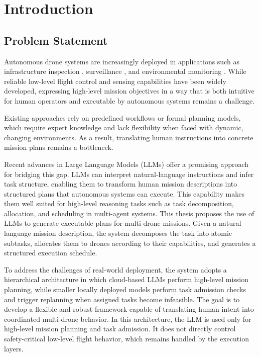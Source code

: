 \chapter{Introduction}

\section{Problem Statement}
Autonomous drone systems are increasingly deployed in applications such as infrastructure inspection \cite{jacobsen2023drone},
surveillance \cite{dinesh2018autonomous}, and environmental monitoring \cite{anderson2013uav}. While reliable low-level flight 
control and sensing capabilities have been widely developed, expressing high-level mission objectives in a
way that is both intuitive for human operators and executable by autonomous systems remains
a challenge.

Existing approaches rely on predefined workflows or formal planning models, which require expert knowledge and lack flexibility
when faced with dynamic, changing environments. As a result, translating human instructions into concrete mission plans
remains a bottleneck.

Recent advances in Large Language Models (LLMs) offer a promising approach for bridging
this gap. LLMs can interpret natural-language instructions and infer task structure, enabling
them to transform human mission descriptions into structured plans that autonomous systems
can execute. This capability makes them well suited for high-level reasoning tasks such as task
decomposition, allocation, and scheduling in multi-agent systems.
This thesis proposes the use of LLMs to generate executable plans for multi-drone missions.
Given a natural-language mission description, the system decomposes the task into atomic
subtasks, allocates them to drones according to their capabilities, and generates a structured
execution schedule.

To address the challenges of real-world deployment, the system adopts a hierarchical architecture
in which cloud-based LLMs perform high-level mission planning, while smaller locally deployed models
perform task admission checks and trigger replanning when assigned tasks become infeasible.
The goal is to develop a flexible and robust framework capable of translating human intent into coordinated 
multi-drone behavior.
In this architecture, the LLM is used only for high-level mission planning and task admission.
It does not directly control safety-critical low-level flight behavior, which remains handled by
the execution layers.

